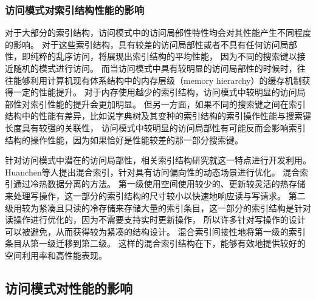\subsubsection{访问模式对索引结构性能的影响}

对于大部分的索引结构，访问模式中的访问局部性特性均会对其性能产生不同程度的影响。
对于这些索引结构，具有较差的访问局部性或者不具有任何访问局部性，即纯粹的乱序访问，将展现出索引结构的平均性能，
因为不同的搜索键以接近随机的模式进行访问。
而当访问模式中具有较明显的访问局部性的时候时，往往能够利用计算机现有体系结构中的内存层级（memory hierarchy）的缓存机制获得一定的性能提升。
对于内存使用越少的索引结构，访问模式中较明显的访问局部性对索引性能的提升会更加明显。
但另一方面，如果不同的搜索键之间在索引结构中的性能有差异，比如说字典树及其变种的索引结构的索引操作性能与搜索键长度具有较强的关联性，
访问模式中较明显的访问局部性有可能反而会影响索引结构的操作性能，因为如果{\hotkey}恰好是性能较差的那一部分搜索键。

针对访问模式中潜在的访问局部性，相关索引结构研究就这一特点进行开发利用。
Huanchen等人提出混合索引\cite{zhang2016reducing}，针对具有访问偏向性的动态场景进行优化。
混合索引通过冷热数据分离的方法。
第一级使用空间使用较少的、更新较灵活的热存储来处理写操作，这一部分的索引结构的尺寸较小以快速地响应读与写请求。
第二级用较为紧凑且只读的冷存储来存储大量的索引条目，这一部分的索引结构是针对读操作进行优化的，因为不需要支持实时更新操作，
所以许多针对写操作的设计可以被避免，从而获得较为紧凑的结构设计。
混合索引间接性地将第一级的索引条目从第一级迁移到第二级。
这样的混合索引结构在{\skewacc}下，能够有效地提供较好的空间利用率和高性能表现。


\subsection{访问模式对{\li}性能的影响}

